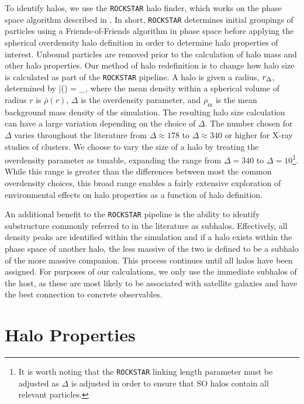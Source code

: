 \documentclass[usenatbib]{mnras}
\begin{document}
To identify halos, we use the {\tt ROCKSTAR} halo finder, which works on the phase space algorithm described in
\citet*{behroozi_etal13a}. In short, {\tt ROCKSTAR} determines initial groupings of particles using a Friends-of-Friends algorithm 
in phase space before applying the spherical overdensity halo definition in order to determine halo properties of
interest. Unbound particles are removed prior to the calculation of halo mass and other halo properties. Our
method of halo redefinition is to change how halo size is calculated as part of the {\tt ROCKSTAR} pipeline. A halo is
given a radius, $r_{\Delta}$, determined by
\beq
	\bar{\rho}(\Rdel) = \Delta \rho_{}, 
\eeq
where the mean density within a spherical volume of radius $r$ is $\bar{\rho}(r)$, $\Delta$ is the overdensity
parameter, and $\rho_{\mathrm{m}}$ is the mean background mass density of the simulation. The resulting
halo size calculation can have a large variation depending on the choice of $\Delta$. The number chosen for
$\Delta$ varies throughout the literature from $\Delta \approx 178$ to $\Delta \approx 340$ or higher for X-ray studies of 
clusters. We choose to vary the size of a halo by treating the overdensity parameter as tunable, expanding the range from 
$\Delta = 340$ to $\Delta = 10$\footnote{It is worth noting that the {\tt ROCKSTAR} linking length parameter must be adjusted 
as $\Delta$ is adjusted in order to ensure that SO halos contain all relevant particles.}. While this range is greater than the 
differences between most the common overdensity choices, this broad range enables a fairly extensive exploration of 
environmental effects on halo properties as a function of halo definition.

An additional benefit to the {\tt ROCKSTAR} pipeline is the ability to identify substructure commonly referred to in the
literature as subhalos. Effectively, all density peaks are identified within the simulation and if a halo exists within the phase
space of another halo, the less massive of the two is defined to be a subhalo of the more massive companion. This process
continues until all halos have been assigned. For purposes of our calculations, we only use the immediate subhalos of the host,
as these are most likely to be associated with satellite galaxies and have the best connection to concrete observables.

\section{Halo Properties}
\label{section:haloprops}
\end{document}
